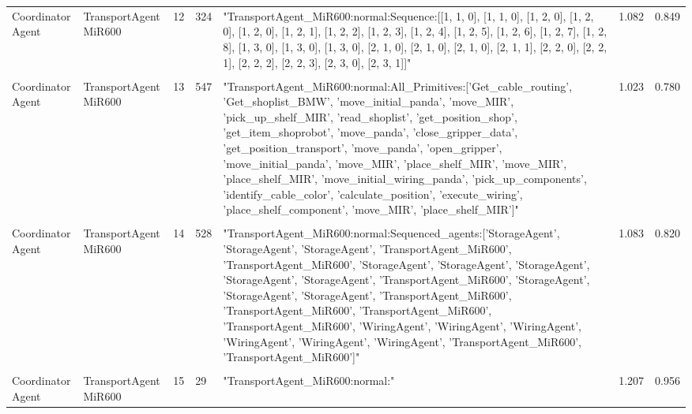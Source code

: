 \begin{table}[b]
\begin{tabular}{m{} m{} m{} m{} m{} m{} m{}}
    Coordinator Agent & TransportAgent MiR600 & 12 & 324 & "TransportAgent\_MiR600:normal:Sequence:{[}{[}1, 1, 0{]}, {[}1, 1, 0{]}, {[}1, 2, 0{]}, {[}1, 2, 0{]}, {[}1, 2, 0{]}, {[}1, 2, 1{]}, {[}1, 2, 2{]}, {[}1, 2, 3{]}, {[}1, 2, 4{]}, {[}1, 2, 5{]}, {[}1, 2, 6{]}, {[}1, 2, 7{]}, {[}1, 2, 8{]}, {[}1, 3, 0{]}, {[}1, 3, 0{]}, {[}1, 3, 0{]}, {[}2, 1, 0{]}, {[}2, 1, 0{]}, {[}2, 1, 0{]}, {[}2, 1, 1{]}, {[}2, 2, 0{]}, {[}2, 2, 1{]}, {[}2, 2, 2{]}, {[}2, 2, 3{]}, {[}2, 3, 0{]}, {[}2, 3, 1{]}{]}"                                                                                                                                                                                                                                      & 1.082 & 0.849 \\ 
    & & & & & &\\
    Coordinator Agent & TransportAgent MiR600 & 13 & 547 & "TransportAgent\_MiR600:normal:All\_Primitives:{[}'Get\_cable\_routing', 'Get\_shoplist\_BMW', 'move\_initial\_panda', 'move\_MIR', 'pick\_up\_shelf\_MIR', 'read\_shoplist', 'get\_position\_shop', 'get\_item\_shoprobot', 'move\_panda', 'close\_gripper\_data', 'get\_position\_transport', 'move\_panda', 'open\_gripper', 'move\_initial\_panda', 'move\_MIR', 'place\_shelf\_MIR', 'move\_MIR', 'place\_shelf\_MIR', 'move\_initial\_wiring\_panda', 'pick\_up\_components', 'identify\_cable\_color', 'calculate\_position', 'execute\_wiring', 'place\_shelf\_component', 'move\_MIR', 'place\_shelf\_MIR'{]}"                                                                  & 1.023 & 0.780 \\ 
    & & & & & &\\
    Coordinator Agent & TransportAgent MiR600 & 14 & 528 & "TransportAgent\_MiR600:normal:Sequenced\_agents:{[}'StorageAgent', 'StorageAgent', 'StorageAgent', 'TransportAgent\_MiR600', 'TransportAgent\_MiR600', 'StorageAgent', 'StorageAgent', 'StorageAgent', 'StorageAgent', 'StorageAgent', 'TransportAgent\_MiR600', 'StorageAgent', 'StorageAgent', 'StorageAgent', 'TransportAgent\_MiR600', 'TransportAgent\_MiR600', 'TransportAgent\_MiR600', 'TransportAgent\_MiR600', 'WiringAgent', 'WiringAgent', 'WiringAgent', 'WiringAgent', 'WiringAgent', 'WiringAgent', 'TransportAgent\_MiR600', 'TransportAgent\_MiR600'{]}" & 1.083 & 0.820 \\ 
    & & & & & &\\
    Coordinator Agent & TransportAgent MiR600 & 15 & 29  & "TransportAgent\_MiR600:normal:"                                                                                                                                                                                                                                                                                                                                                                                                                                                                                                                                                                                                                                                         & 1.207 & 0.956 \\ 

\end{tabular}
\end{table}
